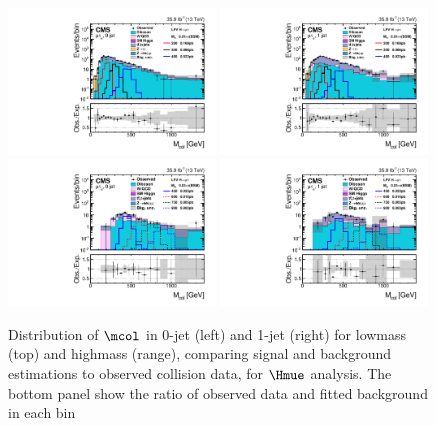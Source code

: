\begin{figure}[!htpb]\centering
 \includegraphics[width=0.49\textwidth]{plots_and_figures/chapter8/highmass/log_low_me_ch1_HMuTau_mutaue_1_2016_postfit_colmass_postfit.pdf}
 \includegraphics[width=0.49\textwidth]{plots_and_figures/chapter8/highmass/log_low_me_ch1_HMuTau_mutaue_2_2016_postfit_colmass_postfit.pdf} \\
 \includegraphics[width=0.49\textwidth]{plots_and_figures/chapter8/highmass/log_high_me_ch1_HMuTau_mutaue_1_2016_postfit_colmass_postfit.pdf}
 \includegraphics[width=0.49\textwidth]{plots_and_figures/chapter8/highmass/log_high_me_ch1_HMuTau_mutaue_2_2016_postfit_colmass_postfit.pdf} 
\caption{Distribution of $\mcol$ in 0-jet (left) and 1-jet (right) for lowmass (top) and highmass (range), comparing signal and background estimations to observed collision data, for $\Hmue$ analysis. The bottom panel show the ratio of observed data and fitted background in each bin~\cite{HIG-18-017}}
 \label{fig:mcol_dist_Hmue}
\end{figure}


